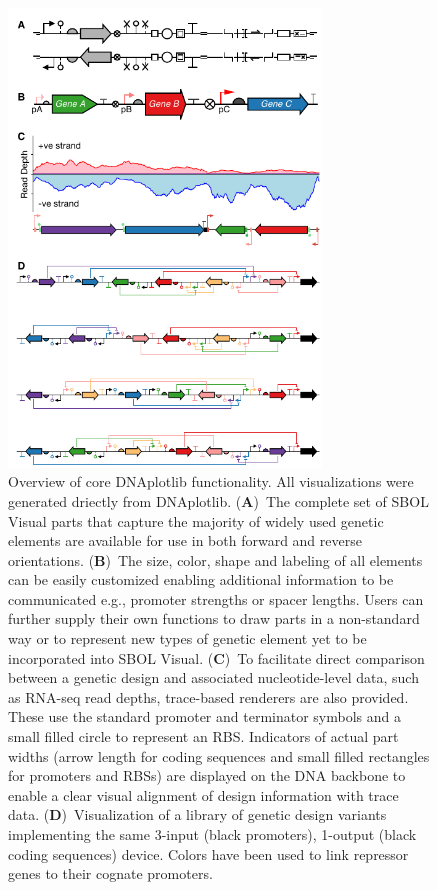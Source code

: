\documentclass{bioinfo}
\begin{document}
\begin{figure}[tb]
\centering
\includegraphics[width=8.3cm]{Figure1.pdf}
\caption{\label{fig:overview}Overview of core DNAplotlib functionality. All visualizations were generated driectly from DNAplotlib. (\textbf{A})~The complete set of SBOL Visual parts that capture the majority of widely used genetic elements are available for use in both forward and reverse orientations. (\textbf{B})~The size, color, shape and labeling of all elements can be easily customized enabling additional information to be communicated e.g., promoter strengths or spacer lengths. Users can further supply their own functions to draw parts in a non-standard way or to represent new types of genetic element yet to be incorporated into SBOL Visual. (\textbf{C})~To facilitate direct comparison between a genetic design and associated nucleotide-level data, such as RNA-seq read depths, trace-based renderers are also provided. These use the standard promoter and terminator symbols and a small filled circle to represent an RBS. Indicators of actual part widths (arrow length for coding sequences and small filled rectangles for promoters and RBSs) are displayed on the DNA backbone to enable a clear visual alignment of design information with trace data. (\textbf{D})~Visualization of a library of genetic design variants implementing the same 3-input (black promoters), 1-output (black coding sequences) device. Colors have been used to link repressor genes to their cognate promoters.}
\end{figure}
\end{document}
